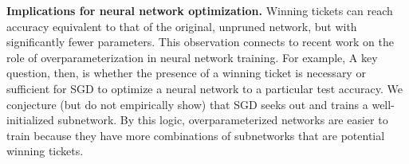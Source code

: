 \textbf{Implications for neural network optimization.}
Winning tickets can reach accuracy equivalent to that of the
original, unpruned network, but with significantly fewer parameters.
This observation connects to recent work on the role of
overparameterization in neural network training.
For example,
 A key question, then,  is whether the presence of a winning ticket is
necessary or sufficient for SGD to optimize a neural network to a
particular test accuracy. We conjecture (but do not empirically show) that
SGD seeks out and trains a well-initialized subnetwork. By this
logic, overparameterized networks are easier to train because they have more
combinations of subnetworks that are potential
winning tickets.